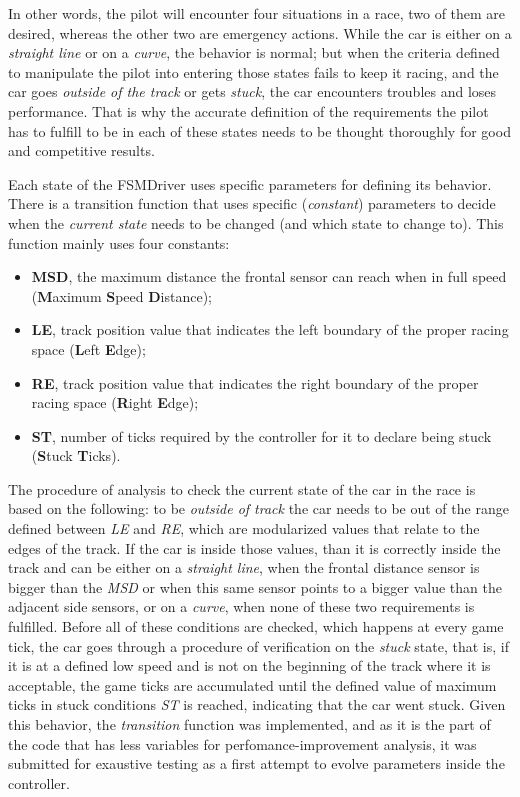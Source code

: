 	In other words, the pilot will encounter four situations in a race, two of them are desired, whereas the other two are 
	emergency actions. While the car is either on a \emph{straight line} or on a \emph{curve}, the behavior is normal; 
	but when the criteria defined to manipulate the pilot into entering those states fails to keep it racing, and the car 
	goes \emph{outside of the track} or gets \emph{stuck}, the car encounters troubles and loses performance. That is why
	the accurate definition of the requirements the pilot has to fulfill to be in each of these states needs to be thought 
	thoroughly for good and competitive results.

	Each state of the FSMDriver uses specific parameters for defining its behavior. 
	There is a transition function that uses specific (\emph{constant}) parameters
	to decide when the \emph{current state} needs to be changed (and which state to
	change to). This function mainly uses four constants:
	\begin{itemize}
		\item \textbf{MSD}, the maximum distance the frontal sensor can reach when in full speed
		(\textbf{M}aximum \textbf{S}peed \textbf{D}istance);
		\item \textbf{LE}, track position value that indicates the left boundary of the proper racing
		space (\textbf{L}eft \textbf{E}dge);
		\item \textbf{RE}, track position value that indicates the right boundary of the proper racing
		space (\textbf{R}ight \textbf{E}dge);
		\item \textbf{ST}, number of ticks required by the controller for it to declare being stuck
		(\textbf{S}tuck \textbf{T}icks).
	\end{itemize}
	
	The procedure of analysis to check the current state of the car in the race is
	based on the following: to be \emph{outside of track} the car needs to be out of
	the range defined between \emph{LE} and \emph{RE}, which are modularized values
	that relate to the edges of the track. If the car is inside those values, than it
	is correctly inside the track and can be either on a \emph{straight line},
	when the frontal distance sensor is bigger than the \emph{MSD} or when this same
	sensor points to a bigger value than the adjacent side sensors, or on a
	\emph{curve}, when none of these two requirements is fulfilled. Before all of
	these conditions are checked, which happens at every game tick, the car goes through
	a procedure of verification on the \emph{stuck} state, that is, if it is at a defined
	low speed and is not on the beginning of the track where it is acceptable, the game
	ticks are accumulated until the defined value of maximum ticks in stuck conditions
	\emph{ST} is reached, indicating that the car went stuck. Given this behavior, the
	\emph{transition} function was implemented, and as it is the part of the code that
	has less variables for perfomance-improvement analysis, it was submitted for
	exaustive testing as a first attempt to evolve parameters inside the controller.
